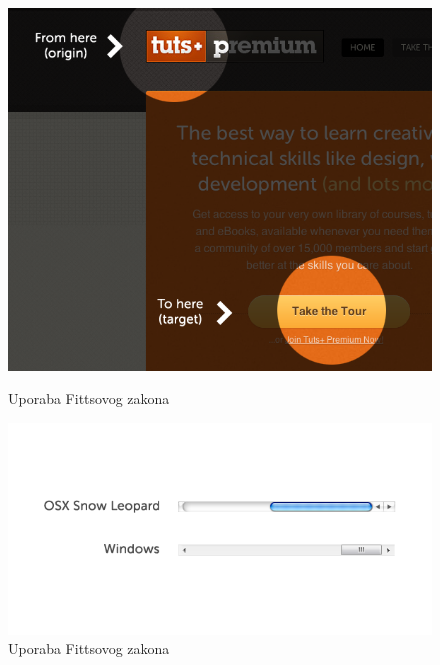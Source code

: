 \documentclass[times, utf8, zavrsni, numeric]{fer}
\begin{document}
\begin{figure}[htb]
  \centering
  \begin{minipage}[b]{0.45\textwidth}
    \includegraphics[width=\textwidth]{img/fitts.png}
    \caption{Uporaba Fittsovog zakona}
    \label{fig:fitts}
  \end{minipage}
  \hfill
  \begin{minipage}[b]{0.45\textwidth}
    \includegraphics[width=\textwidth]{img/scroll.png}
    \caption{Uporaba Fittsovog zakona}
    \label{fig:scroll}
  \end{minipage}
\end{figure}
\end{document}
